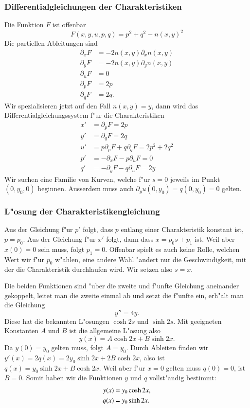 \subsubsection{Differentialgleichungen der Charakteristiken}
Die Funktion $F$ ist offenbar
\[
F(x,y,u,p,q)=p^2+q^2-n(x,y)^2
\]
Die partiellen Ableitungen sind
\begin{align*}
\partial_xF&=-2n(x,y)\partial_x n(x,y)\\
\partial_yF&=-2n(x,y)\partial_y n(x,y)\\
\partial_uF&=0\\
\partial_pF&=2p\\
\partial_qF&=2q.
\end{align*}
Wir spezialisieren jetzt auf den Fall $n(x,y)=y$, dann wird das 
Differentialgleichungssystem f"ur die Charakteristiken
\begin{align*}
x'&=\partial_pF=2p\\
y'&=\partial_qF=2q\\
u'&=p\partial_pF+q\partial_qF=2p^2+2q^2\\
p'&=-\partial_xF-p\partial_uF=0\\
q'&=-\partial_yF-q\partial_uF=2y
\end{align*}
Wir suchen eine Familie von Kurven, welche f"ur $s=0$ jeweils
im Punkt $(0,y_0,0)$ beginnen.
Ausserdem muss auch $\partial_yu(0,y_0)=q(0,y_0)=0$ gelten.

\subsubsection{L"osung der Charakteristikengleichung}
Aus der Gleichung f"ur $p'$ folgt, dass $p$ entlang einer Charakteristik
konstant ist, $p=p_0$. Aus der Gleichung f"ur $x'$ folgt, dann
dass $x=p_0s+p_1$ ist. Weil aber $x(0)=0$ sein muss, folgt $p_1=0$.
Offenbar spielt es auch keine Rolle, welchen Wert wir f"ur $p_0$
w"ahlen, eine andere Wahl "andert nur die Geschwindigkeit, mit der
die Charakteristik durchlaufen wird. Wir setzen also $s=x$.

Die beiden Funktionen sind "uber die zweite und f"unfte Gleichung
aneinander gekoppelt, leitet man die zweite einmal ab und setzt die
f"unfte ein, erh"alt man die Gleichung
\[
y''=4y.
\]
Diese hat die bekannten L"osungen $\cosh 2s$ und $\sinh 2s$.
Mit geeigneten Konstanten $A$ und $B$ ist die allgemeine
L"osung also
\[
y(x)=A\cosh 2x + B\sinh 2x.
\]
Da $y(0)=y_0$ gelten muss, folgt $A=y_0$. Durch Ableiten finden wir
$y'(x)=2q(x)=2y_0\sinh 2x + 2B\cosh 2x$, also ist $q(x)=y_0\sinh 2x+B\cosh 2x$. 
Weil aber f"ur $x=0$ gelten muss $q(0)=0$, ist $B=0$.
Somit haben wir die Funktionen $y$ und $q$ vollst"andig bestimmt:
\begin{align}
y(x)&=y_0\cosh 2x,
\label{nichtlinear:y}
\\
q(x)&=y_0\sinh 2x.\notag
\end{align}


